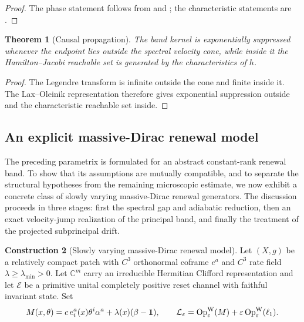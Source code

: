 \documentclass[11pt]{article}
\newtheorem{theorem}{Theorem}[section]
\theoremstyle{definition}
\newtheorem{construction}[theorem]{Construction}
\theoremstyle{remark}
\newcommand{\C}{\mathbb C}
\newcommand{\eps}{\varepsilon}
\begin{document}
\begin{proof}
The phase statement follows from  and
; the characteristic statements are
.
\end{proof}

\begin{theorem}[Causal propagation]
\label{thm:causal-propagation}
The band kernel is exponentially suppressed whenever the endpoint lies outside
the spectral velocity cone, while inside it the Hamilton--Jacobi reachable set is
generated by the characteristics of $h$.
\end{theorem}

\begin{proof}
The Legendre transform is infinite outside the cone and finite inside it.  The
Lax--Oleinik representation therefore gives exponential suppression outside and
the characteristic reachable set inside.
\end{proof}


\subsection{An explicit massive-Dirac renewal model}
\label{subsec:nonempty-model}

The preceding parametrix is formulated for an abstract constant-rank renewal
band. To show that its assumptions are mutually compatible, and to separate
the structural hypotheses from the remaining microscopic estimate, we now
exhibit a concrete class of slowly varying massive-Dirac renewal generators.
The discussion proceeds in three stages: first the spectral gap and adiabatic
reduction, then an exact velocity-jump realization of the principal band, and
finally the treatment of the projected subprincipal drift.

\begin{construction}[Slowly varying massive-Dirac renewal model]
\label{constr:massive-dirac-model}
Let $(X,g)$ be a relatively compact patch with $C^3$ orthonormal coframe $e^a$
and $C^3$ rate field $\lambda\ge\lambda_{\min}>0$.  Let $\C^m$ carry an
irreducible Hermitian Clifford representation and let $\mathcal E$ be a primitive
unital completely positive reset channel with faithful invariant state.  Set
\[
 M(x,\theta)=c\,e^a_i(x)\theta^i\alpha^a+\lambda(x)(\beta-\mathbf 1),
 \qquad
 \mathcal L_\eps=\operatorname{Op}^{\rm W}_\eps(M)
 +\eps\operatorname{Op}^{\rm W}_\eps(\ell_1).
\]
\end{construction}
\end{document}
